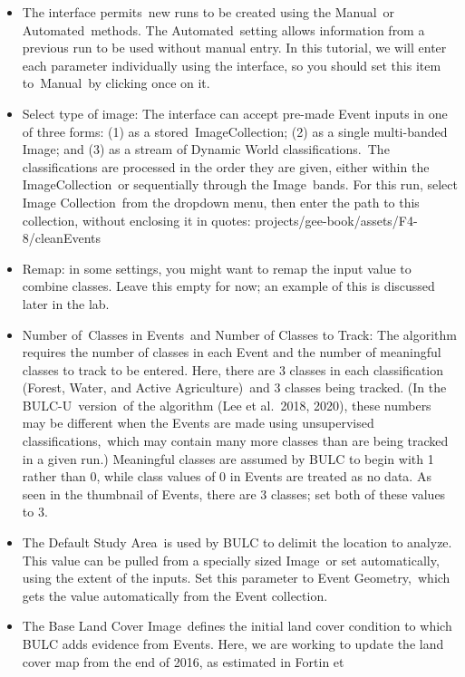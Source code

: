 \documentclass[
  letterpaper,
  DIV=11,
  numbers=noendperiod]{scrreprt}
\providecommand{\tightlist}{%
  \setlength{\itemsep}{0pt}\setlength{\parskip}{0pt}}\usepackage{longtable,booktabs,array}
\begin{document}
\begin{itemize}
\tightlist
\item
  The interface permits~new runs to be created using the Manual~or
  Automated~methods. The Automated~setting allows information from a
  previous run to be used without manual entry. In this tutorial, we
  will enter each parameter individually using the interface, so you
  should set this item to~Manual~by clicking once on it.
\item
  Select type of image: The interface can accept pre-made Event inputs
  in one of three forms: (1) as a stored~ImageCollection; (2) as a
  single multi-banded Image; and (3) as a stream of Dynamic World
  classifications.~The classifications are processed in the order they
  are given, either within the ImageCollection~or sequentially through
  the Image~bands. For this run, select Image Collection~from the
  dropdown menu, then enter the path to this collection, without
  enclosing it in quotes: projects/gee-book/assets/F4-8/cleanEvents
\item
  Remap: in some settings, you might want to remap the input value to
  combine classes. Leave this empty for now; an example of this is
  discussed later in the lab.
\item
  Number of~Classes in Events~and Number of Classes to Track: The
  algorithm requires the number of classes in each Event and the number
  of meaningful classes to track to be entered. Here, there are 3
  classes in each classification (Forest, Water, and Active
  Agriculture)~and 3 classes being tracked. (In the BULC-U~version~of
  the algorithm (Lee et al.~2018, 2020), these numbers may be different
  when the Events are made using unsupervised classifications,~which may
  contain many more classes than are being tracked in a given run.)
  Meaningful classes are assumed by BULC to begin with 1 rather than 0,
  while class values of 0 in Events are treated as no data. As seen in
  the thumbnail of Events, there are 3 classes; set both of these values
  to 3.
\item
  The Default Study Area~is used by BULC to delimit the location to
  analyze. This value can be pulled from a specially sized Image~or set
  automatically, using the extent of the inputs. Set this parameter to
  Event Geometry,~which gets the value automatically from the Event
  collection.
\item
  The Base Land Cover Image~defines the initial land cover condition to
  which BULC adds evidence from Events. Here, we are working to update
  the land cover map from the end of 2016, as estimated in Fortin et

\end{itemize}
\end{document}
